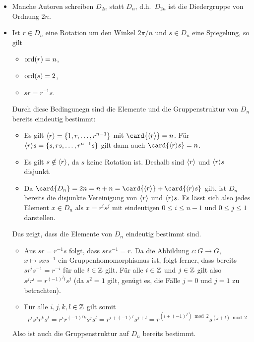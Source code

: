 \begin{itemize}
  \item
    Manche Autoren schreiben $D_{2n}$ statt $D_n$, d.h.\ $D_{2n}$ ist die Diedergruppe von Ordnung $2n$.
    
  \item
    Ist $r \in D_n$ eine Rotation um den Winkel $2\pi/n$ und $s \in D_n$ eine Spiegelung, so gilt
    \begin{itemize}
      \item
        $\operatorname{ord}(r) = n$,
      \item
        $\operatorname{ord}(s) = 2$,
      \item
        $s r = r^{-1} s$.
    \end{itemize}
    Durch diese Bedingunegn sind die Elemente und die Gruppenstruktur von $D_n$ bereits eindeutig bestimmt:
    \begin{itemize}
      \item
        Es gilt $\langle r\rangle = \{1, r, \dotsc, r^{n-1}\}$ mit $\card{ \generated{r} } = n$.
        Für $\langle r\rangle s = \{s, rs, \dotsc, r^{n-1} s\}$ gilt dann auch $\card{ \generated{r} s } = n$.
      \item
        Es gilt $s \notin \langle r\rangle$, da $s$ keine Rotation ist.
        Deshalb sind $\langle r\rangle$ und $\langle r\rangle s$ disjunkt.
      \item
        Da $\card{D_n} = 2n = n + n = \card{\generated{r}} + \card{\generated{r} s}$ gilt, ist $D_n$ bereits die disjunkte Vereinigung von $\langle r\rangle$ und $\langle r\rangle s$.
        Es lässt sich also jedes Element $x \in D_n$ als $x = r^i s^j$ mit eindeutigen $0 \leq i \leq n-1$ und $0 \leq j \leq 1$ darstellen.
    \end{itemize}
    Das zeigt, dass die Elemente von $D_n$ eindeutig bestimmt sind.
    \begin{itemize}[resume]
      \item
        Aus $s r = r^{-1} s$ folgt, dass $s r s^{-1} = r$.
        Da die Abbildung $c \colon G \to G$, $x \mapsto s x s^{-1}$ ein Gruppenhomomorphismus ist, folgt ferner, dass bereits $s r^i s^{-1} = r^{-i}$ für alle $i \in \mathbb{Z}$ gilt.
        Für alle $i \in \mathbb{Z}$ und $j \in \mathbb{Z}$ gilt also $s^j r^i = r^{(-1)^j i} s^j$ (da $s^2 = 1$ gilt, genügt es, die Fälle $j = 0$ und $j = 1$ zu betrachten).
      \item
        Für alle $i, j, k , l \in \mathbb{Z}$ gilt somit
        \[
            r^i s^j r^k s^l
          = r^i r^{(-1)^j k} s^j s^l
          = r^{i + (-1)^j } s^{j + l}
          = r^{(i + (-1)^j) \bmod 2} s^{(j + l) \bmod 2}
        \]
    \end{itemize}
    Also ist auch die Gruppenstruktur auf $D_n$ bereits bestimmt.
    

\end{itemize}
